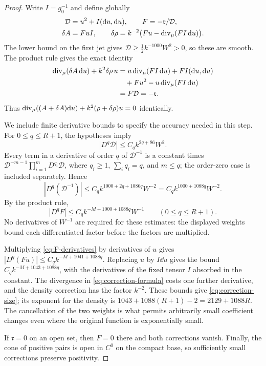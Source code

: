 \begin{proof}
Write $I=g_0^{-1}$ and define globally
\begin{equation}\label{eq:correction-formula}
 \begin{split}
 \mathcal D&=u^2+I(\mathrm d u,\mathrm d u),\qquad F=-\mathfrak r/\mathcal D,\\
 \delta A&=FuI,\qquad
 \delta\rho=k^{-2}\bigl(Fu-\operatorname{div}_\mu(FI\,\mathrm d u)\bigr).
 \end{split}
\end{equation}
The lower bound on the first jet gives
$\mathcal D\ge\tfrac12 k^{-1000}W^2>0$, so these are smooth.
The product rule gives the exact identity
\begin{align*}
 \operatorname{div}_\mu(\delta A\,\mathrm d u)+k^2\delta\rho\,u
 &=u\operatorname{div}_\mu(FI\,\mathrm d u)+F I(\mathrm d u,\mathrm d u)\\
 &\quad+Fu^2-u\operatorname{div}_\mu(FI\,\mathrm d u)\\
 &=F\mathcal D=-\mathfrak r.
\end{align*}
Thus $\operatorname{div}_\mu((A+\delta A)\mathrm d u)
+k^2(\rho+\delta\rho)u=0$ identically.

We include finite derivative bounds to specify the accuracy needed
in this step. For $0\le q\le R+1$, the hypotheses imply
\[
 |D^q\mathcal D|\le C_q k^{2q+86}W^2.
\]
Every term in a derivative of order $q$ of $\mathcal D^{-1}$ is a
constant times
$\mathcal D^{-m-1}\prod_{i=1}^m D^{q_i}\mathcal D$, where
$q_i\ge1$, $\sum_iq_i=q$, and $m\le q$; the order-zero case is
included separately. Hence
\[
 |D^q(\mathcal D^{-1})|
 \le C_q k^{1000+2q+1086q}W^{-2}
 =C_q k^{1000+1088q}W^{-2}.
\]
By the product rule,
\begin{equation}\label{eq:F-derivatives}
 |D^qF|\le C_qk^{-M+1000+1088q}W^{-1}
 \qquad(0\le q\le R+1).
\end{equation}
No derivatives of $W^{-1}$ are required for these estimates: the
displayed weights bound each differentiated factor before the
factors are multiplied.

Multiplying \eqref{eq:F-derivatives} by derivatives of $u$ gives
$|D^q(Fu)|\le C_qk^{-M+1041+1088q}$. Replacing $u$ by $I\dd u$
gives the bound $C_qk^{-M+1043+1088q}$, with the derivatives of
the fixed tensor $I$ absorbed in the constant. The divergence in
\eqref{eq:correction-formula} costs one further derivative, and
the density correction has the factor $k^{-2}$. These bounds give
\eqref{eq:correction-size}; its exponent for the density is
$1043+1088(R+1)-2=2129+1088R$.
The cancellation of the two weights is what permits arbitrarily
small coefficient changes even where the original function is
exponentially small.

If $\mathfrak r=0$ on an open set, then $F=0$ there and both
corrections vanish. Finally, the cone of positive pairs is open
in $C^0$ on the compact base, so sufficiently small corrections
preserve positivity.
\end{proof}

